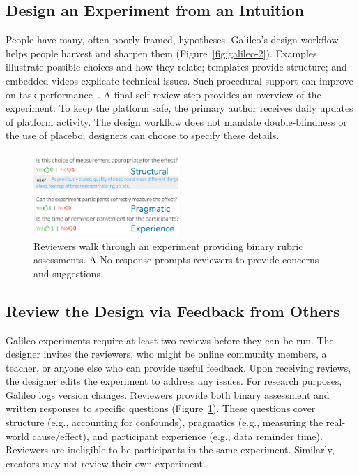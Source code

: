 \subsection{Design an Experiment from an Intuition}
People have many, often poorly-framed, hypotheses. Galileo's design workflow helps people harvest and sharpen them (Figure~\ref{fig:galileo-2}). Examples illustrate possible choices and how they relate; templates provide structure; and embedded videos explicate technical issues. Such procedural support can improve on-task performance~\cite{Pandey2018}. A final self-review step provides an overview of the experiment. To keep the platform safe, the primary author receives daily updates of platform activity. The design workflow does not mandate double-blindness or the use of placebo; designers can choose to specify these details.


\begin{figure}[h]
  \centering
  \includegraphics[width=0.5\textwidth]{figures/galileo/galileo-2-review}
  \caption[Reviewers walk through an experiment providing binary rubric assessments]
{Reviewers walk through an experiment providing binary rubric assessments. A No response prompts reviewers to provide concerns and suggestions.}
  \label{fig:galileo-2-review}
\end{figure}

\subsection{Review the Design via Feedback from Others}
Galileo experiments require at least two reviews before they can be run. The designer invites the reviewers, who might be online community members, a teacher, or anyone else who can provide useful feedback. Upon receiving reviews, the designer edits the experiment to address any issues. For research purposes, Galileo logs version changes. Reviewers provide both binary assessment and written responses to specific questions (Figure~\ref{fig:galileo-2-review}). These questions cover structure (e.g., accounting for confounds), pragmatics (e.g., measuring the real-world cause/effect), and participant experience (e.g., data reminder time). Reviewers are ineligible to be participants in the same experiment. Similarly, creators may not review their own experiment. 

